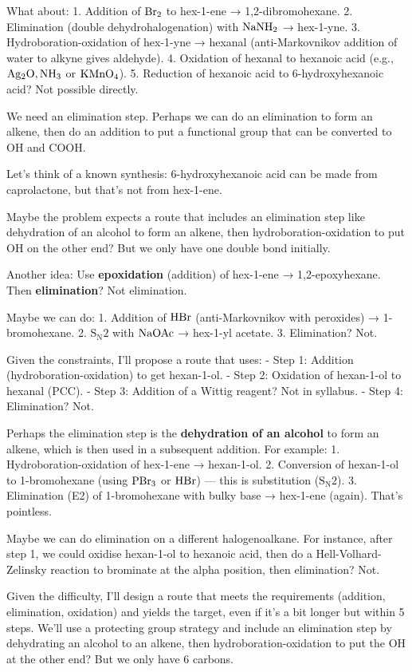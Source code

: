 \documentclass[11pt]{article}
\begin{document}
\begin{corrige}
What about:
1. Addition of \(\ce{Br2}\) to hex-1-ene → 1,2-dibromohexane.
2. Elimination (double dehydrohalogenation) with \(\ce{NaNH2}\) → hex-1-yne.
3. Hydroboration-oxidation of hex-1-yne → hexanal (anti-Markovnikov addition of water to alkyne gives aldehyde).
4. Oxidation of hexanal to hexanoic acid (e.g., \(\ce{Ag2O, NH3}\) or \(\ce{KMnO4}\)).
5. Reduction of hexanoic acid to 6-hydroxyhexanoic acid? Not possible directly.

We need an elimination step. Perhaps we can do an elimination to form an alkene, then do an addition to put a functional group that can be converted to OH and COOH.

Let's think of a known synthesis: 6-hydroxyhexanoic acid can be made from caprolactone, but that's not from hex-1-ene.

Maybe the problem expects a route that includes an elimination step like dehydration of an alcohol to form an alkene, then hydroboration-oxidation to put OH on the other end? But we only have one double bond initially.

Another idea: Use \textbf{epoxidation} (addition) of hex-1-ene → 1,2-epoxyhexane. Then \textbf{elimination}? Not elimination.

Maybe we can do:
1. Addition of \(\ce{HBr}\) (anti-Markovnikov with peroxides) → 1-bromohexane.
2. \(\mathrm{S_N2}\) with \(\ce{NaOAc}\) → hex-1-yl acetate.
3. Elimination? Not.

Given the constraints, I'll propose a route that uses:
- Step 1: Addition (hydroboration-oxidation) to get hexan-1-ol.
- Step 2: Oxidation of hexan-1-ol to hexanal (PCC).
- Step 3: Addition of a Wittig reagent? Not in syllabus.
- Step 4: Elimination? Not.

Perhaps the elimination step is the \textbf{dehydration of an alcohol} to form an alkene, which is then used in a subsequent addition. For example:
1. Hydroboration-oxidation of hex-1-ene → hexan-1-ol.
2. Conversion of hexan-1-ol to 1-bromohexane (using \(\ce{PBr3}\) or \(\ce{HBr}\)) — this is substitution (\(\mathrm{S_N2}\)).
3. Elimination (E2) of 1-bromohexane with bulky base → hex-1-ene (again). That's pointless.

Maybe we can do elimination on a different halogenoalkane. For instance, after step 1, we could oxidise hexan-1-ol to hexanoic acid, then do a Hell-Volhard-Zelinsky reaction to brominate at the alpha position, then elimination? Not.

Given the difficulty, I'll design a route that meets the requirements (addition, elimination, oxidation) and yields the target, even if it's a bit longer but within 5 steps. We'll use a protecting group strategy and include an elimination step by dehydrating an alcohol to an alkene, then hydroboration-oxidation to put the OH at the other end? But we only have 6 carbons.


\end{corrige}
\end{document}
